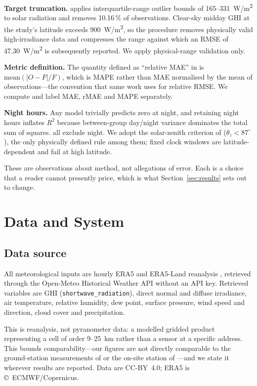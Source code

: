 \documentclass[conference]{IEEEtran}
\begin{document}
\textbf{Target truncation.} \cite{P4} applies interquartile-range
outlier bounds of 165--331~W/m\textsuperscript{2} to solar radiation
and removes 10.16\,\% of observations. Clear-sky midday GHI at the
study's latitude exceeds 900~W/m\textsuperscript{2}, so the procedure
removes physically valid high-irradiance data and compresses the range
against which an RMSE of 47.30~W/m\textsuperscript{2} is subsequently
reported. We apply physical-range validation only.

\textbf{Metric definition.} The quantity defined as ``relative MAE'' in
\cite{P2} is $\mathrm{mean}(|O-F|/F)$, which is MAPE rather than MAE
normalised by the mean of observations---the convention that same work
uses for relative RMSE. We compute and label MAE, rMAE and MAPE
separately.

\textbf{Night hours.} Any model trivially predicts zero at night, and
retaining night hours inflates $R^{2}$ because between-group day/night
variance dominates the total sum of squares. \cite{P2,P3,P4} all
exclude night. We adopt the solar-zenith criterion of \cite{P3}
($\theta_{z} < 87^{\circ}$), the only physically defined rule among
them; fixed clock windows are latitude-dependent and fail at high
latitude.

These are observations about method, not allegations of error. Each is
a choice that a reader cannot presently price, which is what
Section~\ref{sec:results} sets out to change.

\section{Data and System}

\subsection{Data source}

All meteorological inputs are hourly ERA5 and ERA5-Land reanalysis
\cite{hersbach2020}, retrieved through the Open-Meteo Historical
Weather API \cite{openmeteo} without an API key. Retrieved variables
are GHI (\texttt{shortwave\_radiation}), direct normal and diffuse
irradiance, air temperature, relative humidity, dew point, surface
pressure, wind speed and direction, cloud cover and precipitation.

This is reanalysis, not pyranometer data: a modelled gridded product
representing a cell of order 9--25~km rather than a sensor at a
specific address. This bounds comparability---our figures are not
directly comparable to the ground-station measurements of \cite{P2} or
the on-site station of \cite{P4}---and we state it wherever results are
reported. Data are CC-BY~4.0; ERA5 is \copyright~ECMWF/Copernicus.
\end{document}
